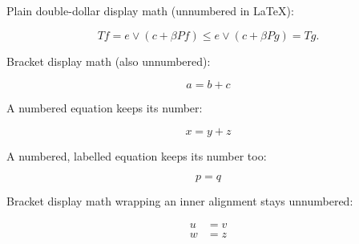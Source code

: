 Plain double-dollar display math (unnumbered in LaTeX):

$$
Tf = e \vee (c + \beta Pf) \leq e \vee (c + \beta Pg) = Tg.
$$

Bracket display math (also unnumbered):

\[
a = b + c
\]

A numbered equation keeps its number:

\begin{equation}
x = y + z
\end{equation}

A numbered, labelled equation keeps its number too:

\begin{equation}\label{eq:foo}
p = q
\end{equation}

Bracket display math wrapping an inner alignment stays unnumbered:

\[
\begin{aligned}
u &= v \\
w &= z
\end{aligned}
\]

